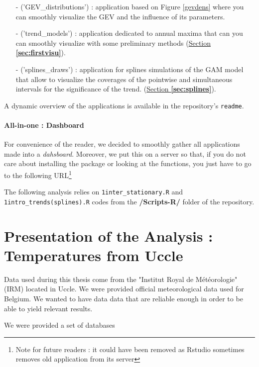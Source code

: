 \begin{itemize}
	\item[-]('GEV\_distributions') :  application based on Figure \ref{gevdens} where you can smoothly visualize the GEV and the influence of its parameters.
	
	\item[-] ('trend\_models') :
	application dedicated to annual maxima that can you can smoothly visualize with some preliminary methods (\hyperref[sec:firstvisu]{Section \textbf{\ref{sec:firstvisu}}}).
	
	\item[-] ('splines\_draws') : application for splines simulations of the GAM model that allow to visualize the coverages of the pointwise and simultaneous intervals for the significance of the trend. (\hyperref[sec:splines]{Section \textbf{\ref{sec:splines}}}).

\end{itemize}
A dynamic overview of the applications is available in the repository's \texttt{readme}.

\paragraph*{All-in-one : Dashboard} For convenience of the reader, we decided to smoothly gather all applications made into a \emph{dahsboard}. Moreover, we put this on a server so that, if you do not care about installing the package or looking at the functions, you just have to go to the following URL\footnote{Note for future readers : it could have been removed as Rstudio sometimes removes old application from its server}
\newline

The following analysis relies on \texttt{1inter\_stationary.R} and \texttt{1intro\_trends(splines).R} codes from the \textbf{/Scripts-R/} folder of the  repository.


\section{Presentation of the Analysis : Temperatures from Uccle}\label{sec:presuccle}

Data used during this thesis come from the "Institut Royal de Météorologie" (IRM) located in Uccle. We were provided official meteorological data used for Belgium. We wanted to have data data that are reliable enough in order to be able to yield relevant results. 

We were provided a set of databases 


